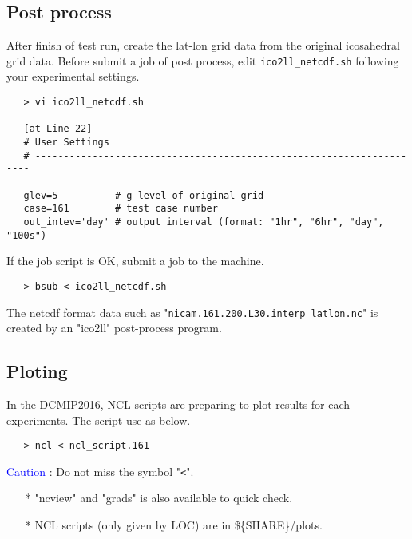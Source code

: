 \documentclass[a4paper]{article}
\begin{document}
\subsection{Post process}
 After finish of test run, create the lat-lon grid data from
 the original icosahedral grid data.
 Before submit a job of post process, edit \verb|ico2ll_netcdf.sh|
 following your experimental settings.
 \begin{verbatim}
   > vi ico2ll_netcdf.sh

   [at Line 22]
   # User Settings
   # ---------------------------------------------------------------------
   
   glev=5          # g-level of original grid
   case=161        # test case number
   out_intev='day' # output interval (format: "1hr", "6hr", "day", "100s")
 \end{verbatim}

 \noindent If the job script is OK, submit a job to the machine.
 \begin{verbatim}
   > bsub < ico2ll_netcdf.sh
 \end{verbatim}

 \noindent The netcdf format data such as "\verb|nicam.161.200.L30.interp_latlon.nc|"
 is created by an "ico2ll" post-process program.


\subsection{Ploting}
 In the DCMIP2016, NCL scripts are preparing to plot results
 for each experiments. The script use as below.
 \begin{verbatim}
   > ncl < ncl_script.161
 \end{verbatim}
 \noindent \textcolor{blue}{{\sf Caution}} : Do not miss the symbol "\verb|<|". \\

 \begin{itemize}
   \item[*] "ncview" and "grads" is also available to quick check.
   \item[*] NCL scripts (only given by LOC) are in \$\{SHARE\}/plots.
 \end{itemize}



\clearpage
\end{document}

